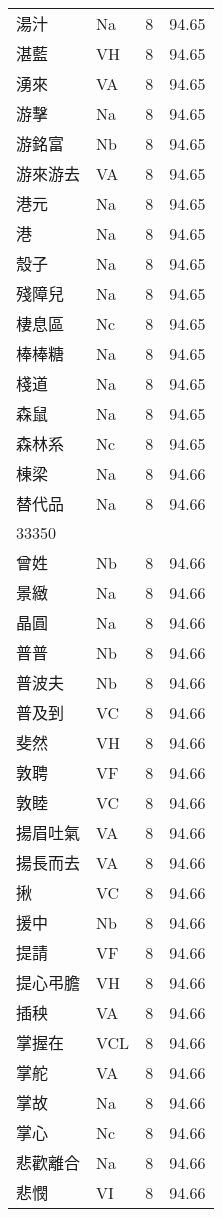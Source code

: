\documentclass[twocolumn]{book}
\begin{document}
\begin{supertabular}{llrr}
湯汁 & Na & 8 &  94.65\\
湛藍 & VH & 8 &  94.65\\
湧來 & VA & 8 &  94.65\\
游擊 & Na & 8 &  94.65\\
游銘富 & Nb & 8 &  94.65\\
游來游去 & VA & 8 &  94.65\\
港元 & Na & 8 &  94.65\\
港 & Na & 8 &  94.65\\
殼子 & Na & 8 &  94.65\\
殘障兒 & Na & 8 &  94.65\\
棲息區 & Nc & 8 &  94.65\\
棒棒糖 & Na & 8 &  94.65\\
棧道 & Na & 8 &  94.65\\
森鼠 & Na & 8 &  94.65\\
森林系 & Nc & 8 &  94.65\\
棟梁 & Na & 8 &  94.66\\
替代品 & Na & 8 &  94.66\\
33350\\
曾姓 & Nb & 8 &  94.66\\
景緻 & Na & 8 &  94.66\\
晶圓 & Na & 8 &  94.66\\
普普 & Nb & 8 &  94.66\\
普波夫 & Nb & 8 &  94.66\\
普及到 & VC & 8 &  94.66\\
斐然 & VH & 8 &  94.66\\
敦聘 & VF & 8 &  94.66\\
敦睦 & VC & 8 &  94.66\\
揚眉吐氣 & VA & 8 &  94.66\\
揚長而去 & VA & 8 &  94.66\\
揪 & VC & 8 &  94.66\\
援中 & Nb & 8 &  94.66\\
提請 & VF & 8 &  94.66\\
提心弔膽 & VH & 8 &  94.66\\
插秧 & VA & 8 &  94.66\\
掌握在 & VCL & 8 &  94.66\\
掌舵 & VA & 8 &  94.66\\
掌故 & Na & 8 &  94.66\\
掌心 & Nc & 8 &  94.66\\
悲歡離合 & Na & 8 &  94.66\\
悲憫 & VI & 8 &  94.66\\

\end{supertabular}
\end{document}
